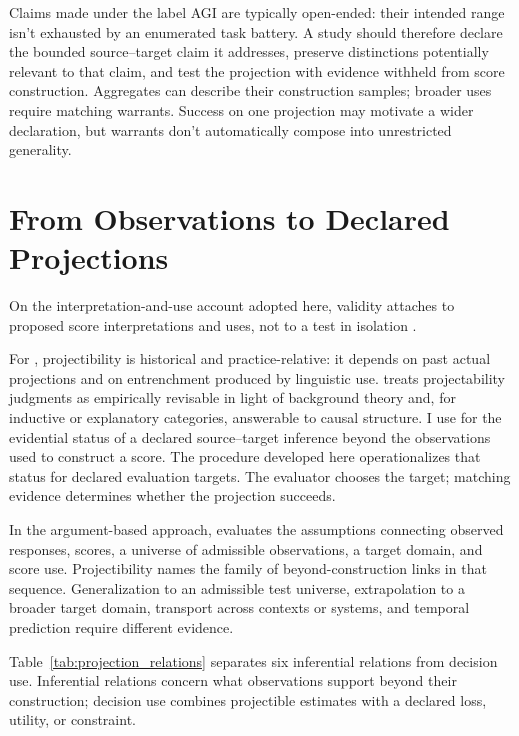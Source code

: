 \documentclass[12pt]{article}
\begin{document}
Claims made under the label AGI are typically open-ended: their intended range isn't exhausted by an enumerated task battery. A study should therefore declare the bounded source--target claim it addresses, preserve distinctions potentially relevant to that claim, and test the projection with evidence withheld from score construction. Aggregates can describe their construction samples; broader uses require matching warrants. Success on one projection may motivate a wider declaration, but warrants don't automatically compose into unrestricted generality.

\section{From Observations to Declared Projections}\label{sec:projection}

On the interpretation-and-use account adopted here, validity attaches to proposed score interpretations and uses, not to a test in isolation \citep{messick_1989_validity,messick1995Validity,kane2013validating}.

For \textcite[85--86, 94--98]{Goodman1983}, projectibility is historical and practice-relative: it depends on past actual projections and on entrenchment produced by linguistic use. \textcite[136--141]{boyd1991} treats projectability judgments as empirically revisable in light of background theory and, for inductive or explanatory categories, answerable to causal structure. I use  for the evidential status of a declared source--target inference beyond the observations used to construct a score. The procedure developed here operationalizes that status for declared evaluation targets. The evaluator chooses the target; matching evidence determines whether the projection succeeds.

In the argument-based approach, \textcite{kane2013validating} evaluates the assumptions connecting observed responses, scores, a universe of admissible observations, a target domain, and score use. Projectibility names the family of beyond-construction links in that sequence. Generalization to an admissible test universe, extrapolation to a broader target domain, transport across contexts or systems, and temporal prediction require different evidence.

Table~\ref{tab:projection_relations} separates six inferential relations from decision use. Inferential relations concern what observations support beyond their construction; decision use combines projectible estimates with a declared loss, utility, or constraint.
\end{document}
